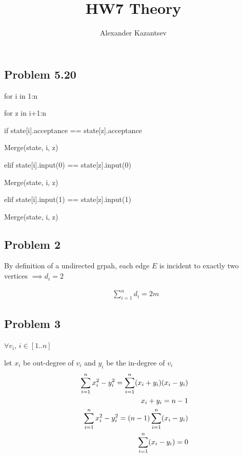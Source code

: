 \documentclass[10pt,letterpaper,oneside]{article}
\title{HW7 Theory}
\author{Alexander Kazantsev}
\newcommand{\Problem}[1]{\subsection*{Problem #1}}
\newcommand\tab[1][1cm]{\hspace*{#1}}
\begin{document}
\Problem{5.20}
for i in 1:n

\tab for z in i+1:n

\tab\tab if state[i].acceptance == state[z].acceptance

\tab\tab\tab Merge(state, i, z)

\tab\tab elif  state[i].input(0) == state[z].input(0)

\tab\tab\tab  Merge(state, i, z)

\tab\tab elif  state[i].input(1) == state[z].input(1)

\tab\tab\tab  Merge(state, i, z)
\Problem{2}

By definition of a undirected grpah, each edge $E$ is incident to exactly two vertices $\implies d_i = 2$

\begin{eqnarray*}
			\text{ $\sum_{i=1}^n d_i = 2m$}
\end{eqnarray*}
\Problem{3}
$\forall v_i$, $ i \in [1..n]$

let $x_i$ be out-degree of $v_i$ and $y_i$ be the in-degree of $v_i$
\begin{eqnarray*}
			\text{ $\sum_{i=1}^n x_i^2 - y_i^2  = \sum_{i=1}^n (x_i + y_i)(x_i - y_i)$}\\
			\text{ $x_i + y_i = n-1$}\\
			\text{ $\sum_{i=1}^n x_i^2 - y_i^2  = (n-1)\sum_{i=1}^n (x_i - y_i)$}\\
			\text{ $ \sum_{i=1}^n (x_i - y_i) = 0$}\\
\end{eqnarray*}

\maketitle
\end{document}
